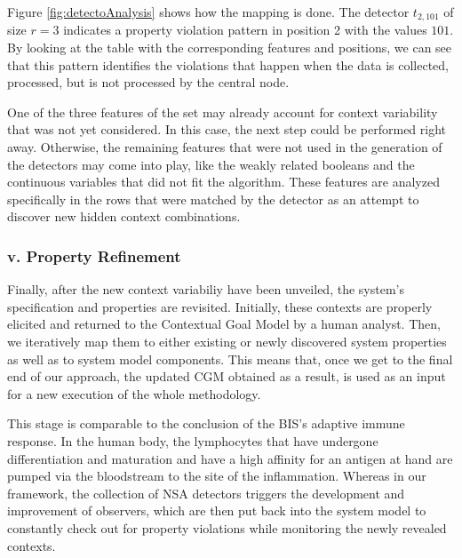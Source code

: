 Figure \ref{fig:detectoAnalysis} shows how the mapping is done. The detector \(t_{2, 101}\) of size \(r = 3\) indicates a property violation pattern in position 2 with the values \(101\). By looking at the table with the corresponding features and positions, we can see that this pattern identifies the violations that happen when the data is collected, processed, but is not processed by the central node.  

One of the three features of the set may already account for context variability that was not yet considered. In this case, the next step could be performed right away. Otherwise, the remaining features that were not used in the generation of the detectors may come into play, like the weakly related booleans and the continuous variables that did not fit the algorithm. These features are analyzed specifically in the rows that were matched by the detector as an attempt to discover new hidden context combinations.


\subsubsection{v. Property Refinement}

Finally, after the new context variabiliy have been unveiled, the system's specification and properties are revisited. Initially, these contexts are properly elicited and returned to the Contextual Goal Model by a human analyst. Then, we iteratively map them to either existing or newly discovered system properties as well as to system model components. This means that, once we get to the final end of our approach, the updated CGM obtained as a result, is used as an input for a new execution of the whole methodology.

This stage is comparable to the conclusion of the BIS's adaptive immune response. In the human body, the lymphocytes that have undergone differentiation and maturation and have a high affinity for an antigen at hand are pumped via the bloodstream to the site of the inflammation. Whereas in our framework, the collection of NSA detectors triggers the development and improvement of observers, which are then put back into the system model to constantly check out for property violations while monitoring the newly revealed contexts.


